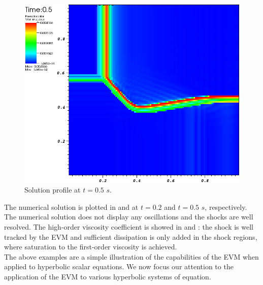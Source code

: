 \begin{figure}[H]
	\centering
	\includegraphics[width=\textwidth]{figures/Burger2D_visc_t0p5.png}
	\caption{Solution profile at $t=0.5$ $s$.}
	\label{fig:2d_burger_visc_t0p5}
\end{figure}
%
The numerical solution is plotted in  and  at $t=0.2$ and $t=0.5$ $s$, respectively. The numerical solution does not display any oscillations and the shocks are well resolved. The high-order viscosity coefficient is showed in  and : the shock is well tracked by the EVM and sufficient dissipation is only added in the shock regions, where saturation to the first-order viscosity is achieved.\\

The above examples are a simple illustration of the capabilities of the EVM when applied to hyperbolic scalar equations. We now focus our attention to the application of the EVM to various hyperbolic systems of equation.